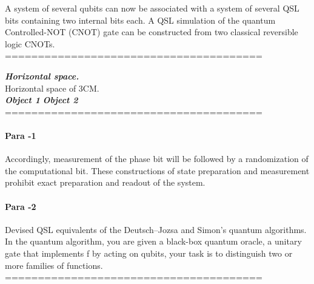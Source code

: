 \documentclass{article}
\begin{document}
	\vspace{3cm}  %
	
	A system of several qubits can now be associated with a system of several QSL bits containing two internal bits each. A QSL simulation of the quantum Controlled-NOT (CNOT) gate can be constructed from two classical reversible logic CNOTs.
	=======================================							

	\textbf{\textit{Horizontal space.}}\\
	
	Horizontal space of 3CM.\\
	
	\textbf{\textit{Object 1}}  \hspace{3cm} \textbf{\textit{Object 2}} %
	=======================================								

	\paragraph{Para -1}Accordingly, measurement of the phase bit will be followed by a randomization
	of the computational bit. These constructions of state preparation and measurement
	prohibit exact preparation and readout of the system.
	\paragraph{Para -2}Devised QSL equivalents of the Deutsch–Jozsa and Simon’s quantum algorithms. In
	the quantum algorithm, you are given a black-box quantum oracle, a unitary gate that
	implements f by acting on qubits, your task is to distinguish two or more families of
	functions.
	=======================================									
						
						
						
\end{document}
